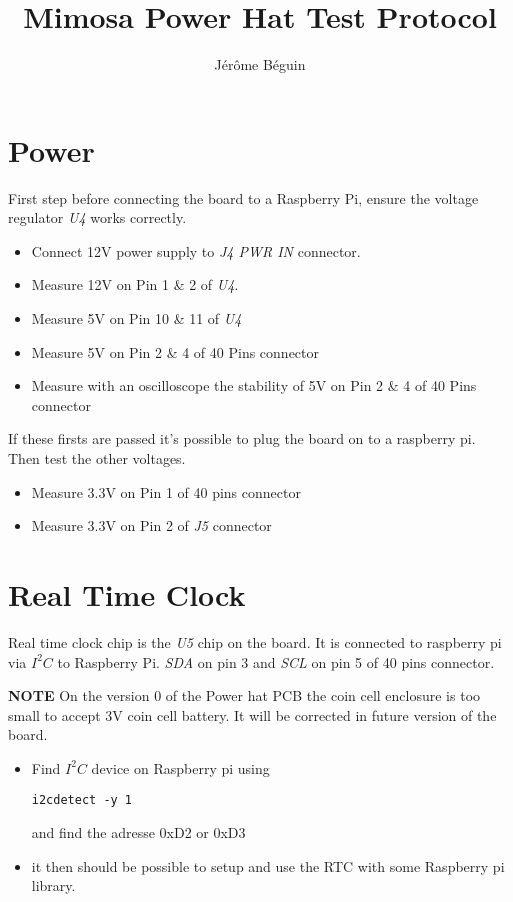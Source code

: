 \documentclass[10pt]{article} %
\title{Mimosa Power Hat Test Protocol}
\author{Jérôme Béguin}
\begin{document}
\maketitle

\section{Power}

First step before connecting the board to a Raspberry Pi, ensure the voltage regulator \emph{U4} works correctly. 
\begin{itemize}
\item Connect 12V power supply to \emph{J4 PWR IN} connector. 
\item Measure 12V on Pin 1 \& 2 of \emph{U4}. 
\item Measure 5V on Pin 10 \& 11 of \emph{U4}
\item Measure 5V on Pin 2 \& 4 of 40 Pins connector
\item Measure with an oscilloscope the stability of 5V on Pin 2 \& 4 of 40 Pins connector
\end{itemize}

If these firsts are passed it's possible to plug the board on to a raspberry pi. 
Then test the other voltages.

\begin{itemize}
\item Measure 3.3V on Pin 1 of 40 pins connector
\item Measure 3.3V on Pin 2 of \emph{J5} connector
\end{itemize}

\section{Real Time Clock}
Real time clock chip is the \emph{U5} chip on the board. It is connected to raspberry pi via $I^2C$ to Raspberry Pi. \emph{SDA} on pin 3 and \emph{SCL} on pin 5 of 40 pins connector.

\textbf{NOTE}
On the version 0 of the Power hat PCB the coin cell enclosure is too small to accept 3V coin cell battery. It will be corrected in future version of the board.

\begin{itemize}
\item Find $I^2C$ device on Raspberry pi using
\begin{verbatim}
i2cdetect -y 1
\end{verbatim}
and find the adresse 0xD2 or 0xD3
\item it then should be possible to setup and use the RTC with some Raspberry pi library. 
\end{itemize}
\end{document}

